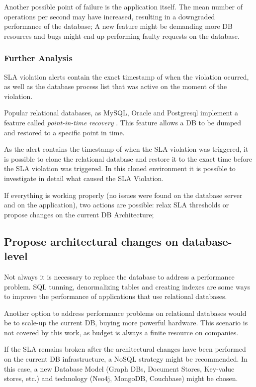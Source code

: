 Another possible point of failure is the application itself. The mean number of operations per second may have increased, resulting in a downgraded performance of the database; A new feature might be demanding more DB resources and bugs might end up performing faulty requests on the database.

\subsubsection{Further Analysis}
SLA violation alerts contain the exact timestamp of when the violation ocurred, as well as the database process list that was active on the moment of the violation. 

Popular relational databases, as MySQL, Oracle and Postgresql implement a feature called \textit{point-in-time recovery} \cite{pitrmysql} \cite{pitroracle} \cite{pitrposgres}. This feature allows a DB to be dumped and restored to a specific point in time.

As the alert contains the timestamp of when the SLA violation was triggered, it is possible to clone the relational database and restore it to the exact time before the SLA violation was triggered. In this cloned environment it is possible to investigate in detail what caused the SLA Violation. 

If everything is working properly (no issues were found on the database server and on the application), two actions are possible: relax SLA thresholds or propose changes on the current DB Architecture;

\subsection{Propose architectural changes on database-level} 

Not always it is necessary to replace the database to address a performance problem. SQL tunning, denormalizing tables and creating indexes are some ways to improve the performance of applications that use relational databases.

Another option to address performance problems on relational databases would be to scale-up the current DB, buying more powerful hardware. This scenario is not covered by this work, as budget is always a finite resource on companies.

If the SLA remains broken after the architectural changes have been performed on the current DB infrastructure, a NoSQL strategy might be recommended. In this case, a new Database Model (Graph DBs, Document Stores, Key-value stores, etc.) and technology (Neo4j, MongoDB, Couchbase) might be chosen.

